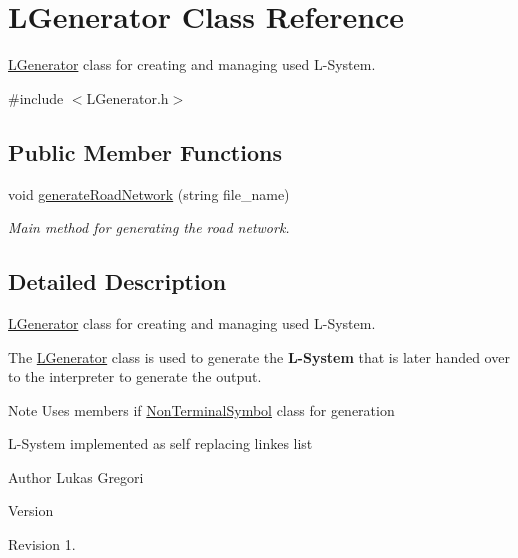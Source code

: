 \hypertarget{class_l_generator}{}\section{L\+Generator Class Reference}
\label{class_l_generator}


\hyperlink{class_l_generator}{L\+Generator} class for creating and managing used L-\/\+System.  




{\ttfamily \#include $<$L\+Generator.\+h$>$}

\subsection*{Public Member Functions}
\begin{DoxyCompactItemize}
\item 
void \hyperlink{class_l_generator_a5cc3d77f073e6bed6218c2793addff7c}{generate\+Road\+Network} (string file\+\_\+name)
\begin{DoxyCompactList}\small\item\em Main method for generating the road network. \end{DoxyCompactList}\end{DoxyCompactItemize}


\subsection{Detailed Description}
\hyperlink{class_l_generator}{L\+Generator} class for creating and managing used L-\/\+System. 

The \hyperlink{class_l_generator}{L\+Generator} class is used to generate the {\bfseries L-\/\+System} that is later handed over to the interpreter to generate the output.

\begin{DoxyNote}{Note}
Uses members if \hyperlink{class_non_terminal_symbol}{Non\+Terminal\+Symbol} class for generation 

L-\/\+System implemented as self replacing linkes list
\end{DoxyNote}
\begin{DoxyAuthor}{Author}
Lukas Gregori 
\end{DoxyAuthor}
\begin{DoxyVersion}{Version}

\end{DoxyVersion}
\begin{DoxyParagraph}{Revision}
1. 
\end{DoxyParagraph}


